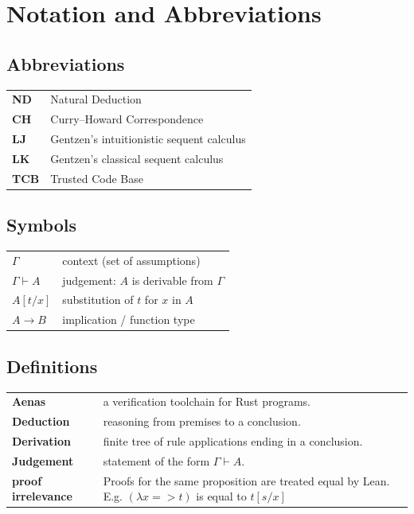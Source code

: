 \chapter*{Notation and Abbreviations}

\section*{Abbreviations}
\renewcommand{\arraystretch}{1.3}
\begin{longtable}{@{}p{}p{}@{}}
  \textbf{ND}  & Natural Deduction \\
  \textbf{CH}  & Curry--Howard Correspondence \\
  \textbf{LJ}  & Gentzen's intuitionistic sequent calculus \\
  \textbf{LK}  & Gentzen's classical sequent calculus \\
  \textbf{TCB}  & Trusted Code Base\\
\end{longtable}

\section*{Symbols}
\begin{longtable}{@{}p{}p{}@{}}
  $\Gamma$             & context (set of assumptions) \\
  $\Gamma \vdash A$    & judgement: $A$ is derivable from $\Gamma$ \\
  $A[t/x]$             & substitution of $t$ for $x$ in $A$ \\
  $A \to B$            & implication / function type \\
\end{longtable}

\section*{Definitions}
\begin{longtable}{@{}p{}p{}@{}}
  \textbf{Aenas}       & a verification toolchain for Rust programs.\\
  \textbf{Deduction}   & reasoning from premises to a conclusion. \\
  \textbf{Derivation}  & finite tree of rule applications ending in a conclusion. \\
  \textbf{Judgement}   & statement of the form $\Gamma \vdash A$. \\
  \textbf{proof irrelevance}   & Proofs for the same proposition are treated equal by Lean. E.g. $(\lambda x => t)$ is equal to $t[s/x]$  \cite{web:lean_propositions_as_types} \\
\end{longtable}